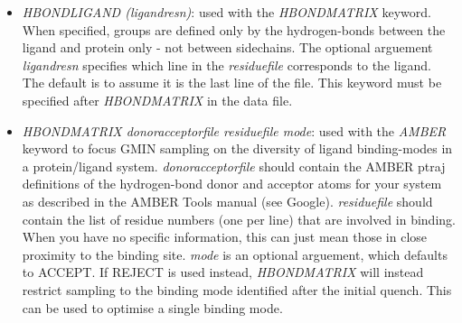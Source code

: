 \documentclass[12pt,a4paper,dvips]{article}
\begin{document}
\begin{itemize}


\item{\it HBONDLIGAND (ligandresn)\/}: used with the {\it HBONDMATRIX} keyword. When specified, groups are defined only
by the hydrogen-bonds between the ligand and protein only - not between sidechains. The optional arguement {\it ligandresn}
specifies which line in the {\it residuefile} corresponds to the ligand. The default is to assume it is the last line of the file.
This keyword must be specified after {\it HBONDMATRIX} in the data file.

\item{\it HBONDMATRIX donoracceptorfile residuefile mode\/}: used with the {\it AMBER} keyword to focus GMIN sampling on 
the diversity of ligand binding-modes in a protein/ligand system. {\it donoracceptorfile} should contain the AMBER ptraj
definitions of the hydrogen-bond donor and acceptor atoms for your system as described in the AMBER Tools manual (see Google).
{\it residuefile} should contain the list of residue numbers (one per line) that are involved in binding. When you have no 
specific information, this can just mean those in close proximity to the binding site. {\it mode} is an optional arguement, which
defaults to ACCEPT. If REJECT is used instead, {\it HBONDMATRIX} will instead restrict sampling to the binding mode identified after
the initial quench. This can be used to optimise a single binding mode.


\end{itemize}
\end{document}
